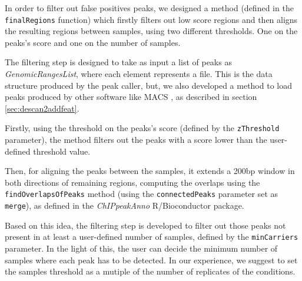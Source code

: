 
In order to filter out false positives peaks, we designed a method (defined in the \lstinline!finalRegions! function) which firstly filters out low score regions and then aligns the resulting regions between samples, using two different thresholds.
One on the peaks's score and one on the number of samples.

The filtering step is designed to take as input a list of peaks as \textit{GenomicRangesList}, where each element represents a file.
This is the data structure produced by the peak caller, but, we also developed a method to load peaks produced by other software like MACS \cite{Zhang2008}, as described in section \ref{sec:descan2addfeat}.

Firstly, using the threshold on the peaks's score (defined by the \lstinline!zThreshold! parameter), the method filters out the peaks with a score lower than the user-defined threshold value.

Then, for aligning the peaks between the samples, it extends a 200bp window in both directions of remaining regions, computing the overlaps using the \lstinline!findOverlapsOfPeaks! method (using the \lstinline!connectedPeaks! parameter set as \lstinline!merge!), as defined in the \textit{ChIPpeakAnno} \cite{Zhu2010} R/Bioconductor package.

Based on this idea, the filtering step is developed to filter out those peaks not present in at least a user-defined number of samples, defined by the \lstinline!minCarriers! parameter. In the light of this, the user can decide the minimum number of samples where each peak has to be detected.
In our experience, we suggest to set the samples threshold as a mutiple of the number of replicates of the conditions.

